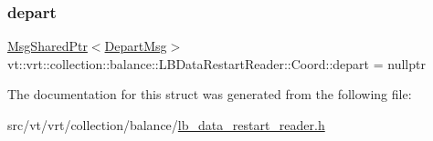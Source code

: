 \mbox{\label{structvt_1_1vrt_1_1collection_1_1balance_1_1_l_b_data_restart_reader_1_1_coord_aaaed15af931102018fbb9148e3b75604}} 
\subsubsection{\texorpdfstring{depart}{depart}}
{\footnotesize\ttfamily \hyperlink{namespacevt_ab2b3d506ec8e8d1540aede826d84a239}{Msg\+Shared\+Ptr}$<$\hyperlink{structvt_1_1vrt_1_1collection_1_1balance_1_1_l_b_data_restart_reader_1_1_depart_msg}{Depart\+Msg}$>$ vt\+::vrt\+::collection\+::balance\+::\+L\+B\+Data\+Restart\+Reader\+::\+Coord\+::depart = nullptr}



The documentation for this struct was generated from the following file\+:\begin{DoxyCompactItemize}
\item 
src/vt/vrt/collection/balance/\hyperlink{lb__data__restart__reader_8h}{lb\+\_\+data\+\_\+restart\+\_\+reader.\+h}\end{DoxyCompactItemize}
